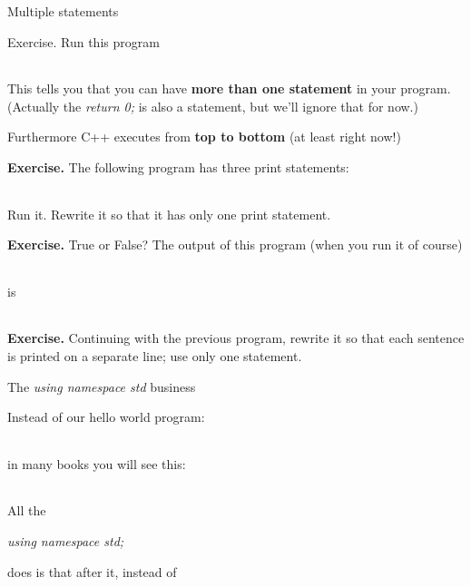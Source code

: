 \documentclass[
]{article}
\begin{document}
Multiple statements

Exercise. Run this program

\begin{longtable}[]{@{}@{}}
\toprule
\endhead
\bottomrule
\end{longtable}

This tells you that you can have \textbf{more than one statement} in
your program. (Actually the \emph{return 0;} is also a statement, but
we'll ignore that for now.)

Furthermore C++ executes from \textbf{top to bottom} (at least right
now!)

\textbf{Exercise.} The following program has three print statements:

\begin{longtable}[]{@{}@{}}
\toprule
\endhead
\bottomrule
\end{longtable}

Run it. Rewrite it so that it has only one print statement.

\textbf{Exercise.} True or False? The output of this program (when you
run it of course)

\begin{longtable}[]{@{}@{}}
\toprule
\endhead
\bottomrule
\end{longtable}

is

\begin{longtable}[]{@{}@{}}
\toprule
\endhead
\bottomrule
\end{longtable}

\textbf{Exercise.} Continuing with the previous program, rewrite it so
that each sentence is printed on a separate line; use only one
statement.

The \emph{using namespace std} business

Instead of our hello world program:

\begin{longtable}[]{@{}@{}}
\toprule
\endhead
\bottomrule
\end{longtable}

in many books you will see this:

\begin{longtable}[]{@{}@{}}
\toprule
\endhead
\bottomrule
\end{longtable}

All the

\emph{using namespace std;}

does is that after it, instead of
\end{document}
